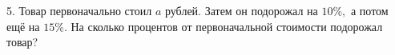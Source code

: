 5. Товар первоначально стоил $a$ рублей. Затем он подорожал на $10\%,$ а потом ещё на $15\%.$ На сколько процентов от первоначальной стоимости подорожал товар?\\
